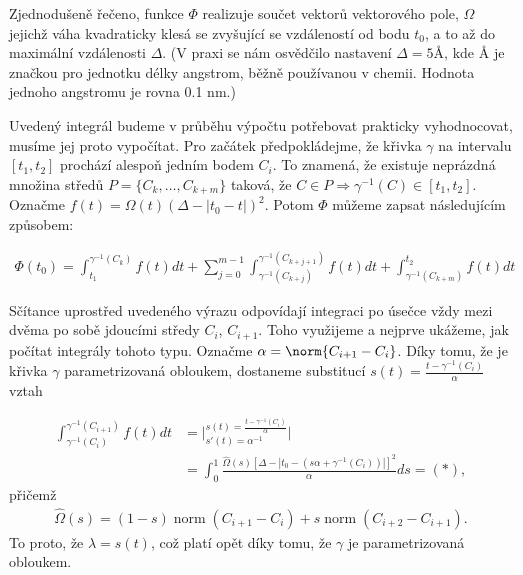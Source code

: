 Zjednodušeně řečeno, funkce $ \Phi $ realizuje součet vektorů vektorového pole,
$ \Omega $ jejichž váha kvadraticky klesá se zvyšující se vzdáleností od bodu
$ t_0 $, a to až do maximální vzdálenosti $ \Delta $. (V praxi se nám osvědčilo
nastavení $ \Delta = 5 $Å, kde Å je značkou pro jednotku délky angstrom, běžně
používanou v chemii. Hodnota jednoho angstromu je rovna 0.1 nm.)

Uvedený integrál budeme v průběhu výpočtu potřebovat prakticky vyhodnocovat,
musíme jej proto vypočítat. Pro začátek předpokládejme, že křivka $ \gamma $ na
intervalu $ [t_1, t_2] $ prochází alespoň jedním bodem $ C_i $. To znamená, že
existuje neprázdná množina středů $ {P = \{C_k, \dots, C_{k + m} \} }$ taková, že
$ C \in P \Rightarrow \gamma^{-1}(C) \in [t_1, t_2]$. Označme
$ f(t) = \Omega(t) (\Delta - \left| t_0 - t \right| )^2 $. Potom $ \Phi $ můžeme zapsat
následujícím způsobem:

\begin{align} \label{eq:integral_sum}
    \Phi(t_0) = \int_{t_1}^{\gamma^{-1}(C_k)} f(t) dt
        + \sum_{j=0}^{m - 1} \int_{\gamma^{-1}(C_{k + j})}^{\gamma^{-1}(C_{k + j + 1})} f(t) dt
        + \int_{\gamma^{-1}(C_{k + m})}^{t_2} f(t) dt
\end{align}

Sčítance uprostřed uvedeného výrazu odpovídají integraci po úsečce vždy mezi
dvěma po sobě jdoucími středy $ C_i $, $C_{i+1} $. Toho využijeme a nejprve ukážeme,
jak počítat integrály tohoto typu. Označme $\alpha = \norm{C_{i + 1} - C_i}$.
Díky tomu, že je křivka $ \gamma $ parametrizovaná
obloukem, dostaneme substitucí
$ s(t) = \frac{t - \gamma^{-1}(C_i)}{\alpha} $ vztah

\begin{align*}
    \int_{\gamma^{-1}(C_{i})}^{\gamma^{-1}(C_{i + 1})} f(t) dt
    &= \bigg\rvert
        ^{s(t) = \frac{t - \gamma^{-1}(C_i)}{\alpha}}
        _{s'(t) = \alpha^{-1}} \bigg\lvert \\
    &= \int_{0}^{1}
        \frac{\widehat{\Omega}(s)
            \left[\Delta - \left| t_0 - (s \alpha + \gamma^{-1}(C_i)) \right| \right]^2}
        {\alpha} ds
    = (*),
\end{align*}
přičemž
\begin{align*}
    \widehat{\Omega}(s) = (1 - s) \operatorname{norm}(C_{i + 1} - C_i)
            + s \operatorname{norm}(C_{i + 2} - C_{i + 1}).
\end{align*}
To proto, že $ \lambda = s(t) $, což platí opět díky tomu, že $ \gamma $ je
parametrizovaná obloukem.

